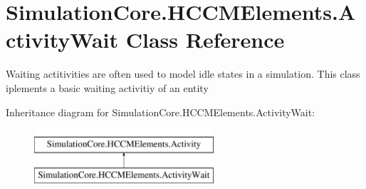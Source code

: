 \hypertarget{class_simulation_core_1_1_h_c_c_m_elements_1_1_activity_wait}{}\section{Simulation\+Core.\+H\+C\+C\+M\+Elements.\+Activity\+Wait Class Reference}
\label{class_simulation_core_1_1_h_c_c_m_elements_1_1_activity_wait}


Waiting actitivities are often used to model idle states in a simulation. This class iplements a basic waiting activitiy of an entity  


Inheritance diagram for Simulation\+Core.\+H\+C\+C\+M\+Elements.\+Activity\+Wait\+:\begin{figure}[H]
\begin{center}
\leavevmode
\includegraphics[height=2.000000cm]{class_simulation_core_1_1_h_c_c_m_elements_1_1_activity_wait}
\end{center}
\end{figure}
